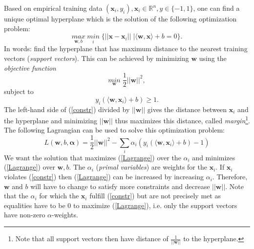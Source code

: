 \documentclass[a4paper,10pt]{article}
\begin{document}
Based on empirical training data $(\mathbf{x}_i,y_i), \mathbf{x}_i \in \mathbb{R}^n, y \in \{-1,1\}$, one can find a unique optimal hyperplane which is the solution of the following optimization problem:
\begin{equation}
 \underset{\mathbf{w},b}{max} \;\underset{i}{min} \;\{||\mathbf{x}-\mathbf{x}_i|| \;| \langle \mathbf{w}, \mathbf{x}\rangle+b=0\}.
\end{equation} 
In words: find the hyperplane that has maximum distance to the nearest training vectors (\textit{support vectors}). This can be achieved by minimizing $\mathbf{w}$ using the \textit{objective function}
\begin{equation}
 \label{obj-f1}
 \underset{\mathbf{w}}{min} \;\frac{1}{2}||\mathbf{w}||^2,
\end{equation} 
subject to 
\begin{equation}
 \label{constr}
y_i(\langle \mathbf{w},\mathbf{x}_i\rangle +b) \ge 1.
\end{equation} 
The left-hand side of (\ref{constr}) divided by $||\mathbf{w}||$ gives the distance between $\mathbf{x}_i$ and the hyperplane and minimizing $||\mathbf{w}||$ thus maximizes this distance, called \textit{margin}\footnote{Note that all support vectors then have distance of $\frac{1}{||\mathbf{w}||}$ to the hyperplane.}. The following Lagrangian can be used to solve this optimization problem:
\begin{equation}
 \label{Lagrange}
 L(\mathbf{w},b,\bm{\alpha}) = \frac{1}{2}||\mathbf{w}||^2 - \sum_{i} \alpha_i(y_i(\langle \mathbf{w},\mathbf{x}_i\rangle +b)-1)
\end{equation} 
We want the solution that maximizes (\ref{Lagrange}) over the $\alpha_i$ and minimizes (\ref{Lagrange}) over $\mathbf{w},b$. The $\alpha_i$ (\textit{primal variables}) are weights for the $\mathbf{x}_i$. If $\mathbf{x}_i$ violates (\ref{constr}) then (\ref{Lagrange}) can be increased by increasing $\alpha_i$. Therefore, $\mathbf{w}$ and $b$ will have to change to satisfy more constraints and decrease $||\mathbf{w}||$. Note that the $\alpha_i$ for which the $\mathbf{x}_i$ fulfill (\ref{constr}) but are not precisely met as equalities have to be 0 to maximize (\ref{Lagrange}), i.e. only the support vectors have non-zero $\alpha$-weights.
\end{document}
